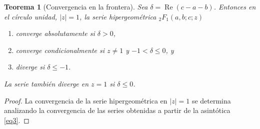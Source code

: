\documentclass[12pt,a4paper]{book}
\renewcommand{\Re}{\operatorname{Re}}
\newtheorem{theorem}{Teorema}
\begin{document}
\begin{theorem}[Convergencia en la frontera]
\label{teo:convergencia_frontera}
Sea $\delta = \Re(c-a-b)$. Entonces en el círculo unidad, $|z|=1$, la serie hipergeométrica ${}_{2}F_{1}(a,b;c;z)$
\begin{enumerate}[label=\alph*)]
    \item converge absolutamente si $\delta > 0$,
    \item converge condicionalmente si $z \neq 1$ y $-1 < \delta \leq 0$, y
    \item diverge si $\delta \leq -1$. 
\end{enumerate}
La serie también diverge en $z=1$ si $\delta \leq 0$.
\end{theorem}

\begin{proof}
La convergencia de la serie hipergeométrica en $|z|=1$ se determina analizando la convergencia de las series obtenidas a partir de la asintótica \eqref{eq3}.


\end{proof}
\end{document}
